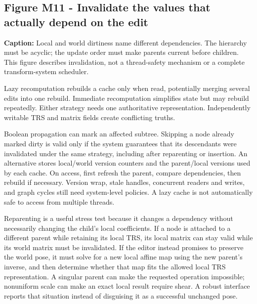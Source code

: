 \subsection{Figure M11 - Invalidate the values that actually depend on the edit}\label{01-foundations-i-ch019-figure-m11---invalidate-the-values-that-actually-depend-on-the-edit}

\hypertarget{01-foundations-i-ch019-figure-m11---invalidate-the-values-that-actually-depend-on-the-edit}{}


\textbf{Caption:} Local and world dirtiness name different dependencies. The hierarchy must be acyclic; the update order must make parents current before children. This figure describes invalidation, not a thread-safety mechanism or a complete transform-system scheduler.

Lazy recomputation rebuilds a cache only when read, potentially merging several edits into one rebuild. Immediate recomputation simplifies state but may rebuild repeatedly. Either strategy needs one authoritative representation. Independently writable TRS and matrix fields create conflicting truths.

Boolean propagation can mark an affected subtree. Skipping a node already marked dirty is valid only if the system guarantees that its descendants were invalidated under the same strategy, including after reparenting or insertion. An alternative stores local/world version counters and the parent/local versions used by each cache. On access, first refresh the parent, compare dependencies, then rebuild if necessary. Version wrap, stale handles, concurrent readers and writes, and graph cycles still need system-level policies. A  lazy cache is not automatically safe to access from multiple threads.

Reparenting is a useful stress test because it changes a dependency without necessarily changing the child's local coefficients. If a node is attached to a different parent while retaining its local TRS, its local matrix can stay valid while its world matrix must be invalidated. If the editor instead promises to preserve the world pose, it must solve for a new local affine map using the new parent's inverse, and then determine whether that map fits the allowed local TRS representation. A singular parent can make the requested operation impossible; nonuniform scale can make an exact local result require shear. A robust interface reports that situation instead of disguising it as a successful unchanged pose.

